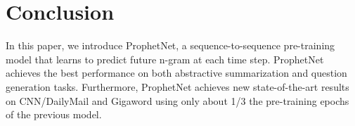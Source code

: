\documentclass[11pt,a4paper]{article}
\begin{document}
\section{Conclusion}
In this paper, we introduce ProphetNet, a sequence-to-sequence pre-training model that learns to predict future n-gram at each time step.
ProphetNet achieves the best performance on both abstractive summarization and question generation tasks. Furthermore, ProphetNet achieves new state-of-the-art results on CNN/DailyMail and Gigaword using only about 1/3 the pre-training epochs of the previous model. 




\newpage



\end{document}
